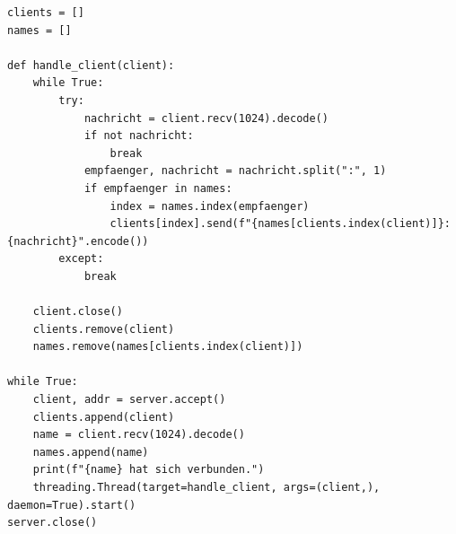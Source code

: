 \begin{myexercise}
\begin{myanswer}
\begin{lstlisting}[caption=\texttt{server.py}]
clients = []
names = []

def handle_client(client):
    while True:
        try:
            nachricht = client.recv(1024).decode()
            if not nachricht:
                break
            empfaenger, nachricht = nachricht.split(":", 1)
            if empfaenger in names:
                index = names.index(empfaenger)
                clients[index].send(f"{names[clients.index(client)]}: {nachricht}".encode())
        except:
            break

    client.close()
    clients.remove(client)
    names.remove(names[clients.index(client)])

while True:
    client, addr = server.accept()
    clients.append(client)
    name = client.recv(1024).decode()
    names.append(name)
    print(f"{name} hat sich verbunden.")
    threading.Thread(target=handle_client, args=(client,), daemon=True).start()
server.close()
            \end{lstlisting}
    \end{myanswer}
\end{myexercise}

